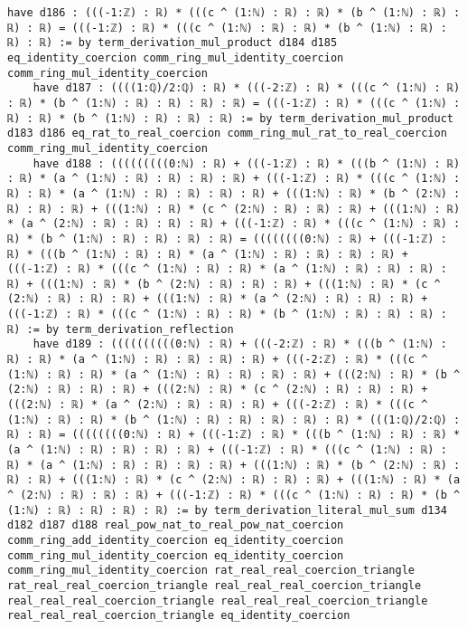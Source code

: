 \documentclass{article}
\begin{document}
\begin{tcolorbox}[colback=white!10, width=\linewidth]
\begin{lstlisting}[language=Lean4]
    have d186 : (((-1:ℤ) : ℝ) * (((c ^ (1:ℕ) : ℝ) : ℝ) * (b ^ (1:ℕ) : ℝ) : ℝ) : ℝ) = (((-1:ℤ) : ℝ) * (((c ^ (1:ℕ) : ℝ) : ℝ) * (b ^ (1:ℕ) : ℝ) : ℝ) : ℝ) := by term_derivation_mul_product d184 d185 eq_identity_coercion comm_ring_mul_identity_coercion comm_ring_mul_identity_coercion
    have d187 : ((((1:ℚ)/2:ℚ) : ℝ) * (((-2:ℤ) : ℝ) * (((c ^ (1:ℕ) : ℝ) : ℝ) * (b ^ (1:ℕ) : ℝ) : ℝ) : ℝ) : ℝ) = (((-1:ℤ) : ℝ) * (((c ^ (1:ℕ) : ℝ) : ℝ) * (b ^ (1:ℕ) : ℝ) : ℝ) : ℝ) := by term_derivation_mul_product d183 d186 eq_rat_to_real_coercion comm_ring_mul_rat_to_real_coercion comm_ring_mul_identity_coercion
    have d188 : (((((((((0:ℕ) : ℝ) + (((-1:ℤ) : ℝ) * (((b ^ (1:ℕ) : ℝ) : ℝ) * (a ^ (1:ℕ) : ℝ) : ℝ) : ℝ) : ℝ) + (((-1:ℤ) : ℝ) * (((c ^ (1:ℕ) : ℝ) : ℝ) * (a ^ (1:ℕ) : ℝ) : ℝ) : ℝ) : ℝ) + (((1:ℕ) : ℝ) * (b ^ (2:ℕ) : ℝ) : ℝ) : ℝ) + (((1:ℕ) : ℝ) * (c ^ (2:ℕ) : ℝ) : ℝ) : ℝ) + (((1:ℕ) : ℝ) * (a ^ (2:ℕ) : ℝ) : ℝ) : ℝ) : ℝ) + (((-1:ℤ) : ℝ) * (((c ^ (1:ℕ) : ℝ) : ℝ) * (b ^ (1:ℕ) : ℝ) : ℝ) : ℝ) : ℝ) = ((((((((0:ℕ) : ℝ) + (((-1:ℤ) : ℝ) * (((b ^ (1:ℕ) : ℝ) : ℝ) * (a ^ (1:ℕ) : ℝ) : ℝ) : ℝ) : ℝ) + (((-1:ℤ) : ℝ) * (((c ^ (1:ℕ) : ℝ) : ℝ) * (a ^ (1:ℕ) : ℝ) : ℝ) : ℝ) : ℝ) + (((1:ℕ) : ℝ) * (b ^ (2:ℕ) : ℝ) : ℝ) : ℝ) + (((1:ℕ) : ℝ) * (c ^ (2:ℕ) : ℝ) : ℝ) : ℝ) + (((1:ℕ) : ℝ) * (a ^ (2:ℕ) : ℝ) : ℝ) : ℝ) + (((-1:ℤ) : ℝ) * (((c ^ (1:ℕ) : ℝ) : ℝ) * (b ^ (1:ℕ) : ℝ) : ℝ) : ℝ) : ℝ) := by term_derivation_reflection
    have d189 : ((((((((((0:ℕ) : ℝ) + (((-2:ℤ) : ℝ) * (((b ^ (1:ℕ) : ℝ) : ℝ) * (a ^ (1:ℕ) : ℝ) : ℝ) : ℝ) : ℝ) + (((-2:ℤ) : ℝ) * (((c ^ (1:ℕ) : ℝ) : ℝ) * (a ^ (1:ℕ) : ℝ) : ℝ) : ℝ) : ℝ) + (((2:ℕ) : ℝ) * (b ^ (2:ℕ) : ℝ) : ℝ) : ℝ) + (((2:ℕ) : ℝ) * (c ^ (2:ℕ) : ℝ) : ℝ) : ℝ) + (((2:ℕ) : ℝ) * (a ^ (2:ℕ) : ℝ) : ℝ) : ℝ) + (((-2:ℤ) : ℝ) * (((c ^ (1:ℕ) : ℝ) : ℝ) * (b ^ (1:ℕ) : ℝ) : ℝ) : ℝ) : ℝ) : ℝ) * (((1:ℚ)/2:ℚ) : ℝ) : ℝ) = ((((((((0:ℕ) : ℝ) + (((-1:ℤ) : ℝ) * (((b ^ (1:ℕ) : ℝ) : ℝ) * (a ^ (1:ℕ) : ℝ) : ℝ) : ℝ) : ℝ) + (((-1:ℤ) : ℝ) * (((c ^ (1:ℕ) : ℝ) : ℝ) * (a ^ (1:ℕ) : ℝ) : ℝ) : ℝ) : ℝ) + (((1:ℕ) : ℝ) * (b ^ (2:ℕ) : ℝ) : ℝ) : ℝ) + (((1:ℕ) : ℝ) * (c ^ (2:ℕ) : ℝ) : ℝ) : ℝ) + (((1:ℕ) : ℝ) * (a ^ (2:ℕ) : ℝ) : ℝ) : ℝ) + (((-1:ℤ) : ℝ) * (((c ^ (1:ℕ) : ℝ) : ℝ) * (b ^ (1:ℕ) : ℝ) : ℝ) : ℝ) : ℝ) := by term_derivation_literal_mul_sum d134 d182 d187 d188 real_pow_nat_to_real_pow_nat_coercion comm_ring_add_identity_coercion eq_identity_coercion comm_ring_mul_identity_coercion eq_identity_coercion comm_ring_mul_identity_coercion rat_real_real_coercion_triangle rat_real_real_coercion_triangle real_real_real_coercion_triangle real_real_real_coercion_triangle real_real_real_coercion_triangle real_real_real_coercion_triangle eq_identity_coercion

\end{lstlisting}
\end{tcolorbox}
\end{document}

